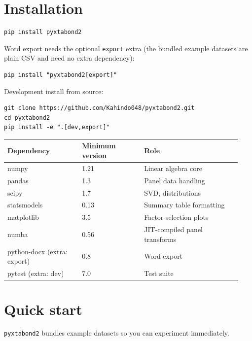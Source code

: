 \documentclass[11pt,a4paper]{article}
\newcommand{\pkg}{\texttt{pyxtabond2}}
\begin{document}
\section{Installation}

\begin{lstlisting}[style=pystyle]
pip install pyxtabond2
\end{lstlisting}

Word export needs the optional \texttt{export} extra (the bundled example
datasets are plain CSV and need no extra dependency):
\begin{lstlisting}[style=pystyle]
pip install "pyxtabond2[export]"
\end{lstlisting}

Development install from source:
\begin{lstlisting}[style=pystyle]
git clone https://github.com/Kahindo048/pyxtabond2.git
cd pyxtabond2
pip install -e ".[dev,export]"
\end{lstlisting}

\begin{longtable}{@{}p{0.3\linewidth}p{0.25\linewidth}p{0.39\linewidth}@{}}
\toprule
\textbf{Dependency} & \textbf{Minimum version} & \textbf{Role} \\
\midrule
\endhead
numpy & 1.21 & Linear algebra core \\
pandas & 1.3 & Panel data handling \\
scipy & 1.7 & SVD, distributions \\
statsmodels & 0.13 & Summary table formatting \\
matplotlib & 3.5 & Factor-selection plots \\
numba & 0.56 & JIT-compiled panel transforms \\
\midrule
python-docx (extra: export) & 0.8 & Word export \\
pytest (extra: dev) & 7.0 & Test suite \\
\bottomrule
\end{longtable}

\section{Quick start}

\pkg{} bundles example datasets so you can experiment immediately.
\end{document}

